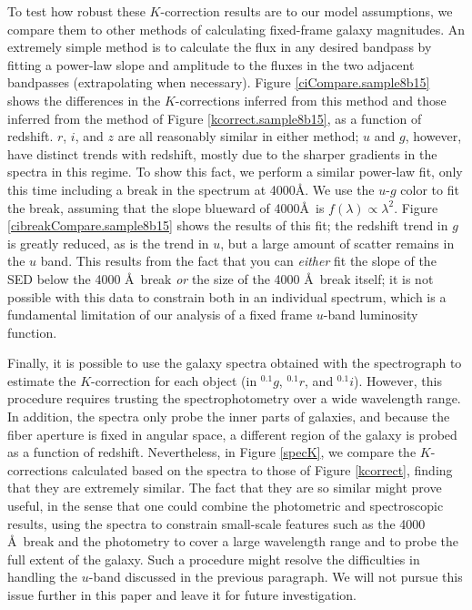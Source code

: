 \documentclass[10pt,preprint]{aastex}
\newcommand{\band}[2]{\ensuremath{^{#1}{#2}}}
\begin{document}
To test how robust these $K$-correction results are to our model
assumptions, we compare them to other methods of calculating
fixed-frame galaxy magnitudes.  An extremely simple method is to
calculate the flux in any desired bandpass by fitting a power-law
slope and amplitude to the fluxes in the two adjacent bandpasses
(extrapolating when necessary). Figure \ref{ciCompare.sample8b15}
shows the differences in the $K$-corrections inferred from this method
and those inferred from the method of Figure
\ref{kcorrect.sample8b15}, as a function of redshift. $r$, $i$, and
$z$ are all reasonably similar in either method; $u$ and $g$, however,
have distinct trends with redshift, mostly due to the sharper
gradients in the spectra in this regime. To show this fact, we perform
a similar power-law fit, only this time including a break in the
spectrum at 4000\AA. We use the $u$-$g$ color to fit the break,
assuming that the slope blueward of 4000\AA\ is $f(\lambda)\propto
\lambda^{2}$.  Figure \ref{cibreakCompare.sample8b15} shows the
results of this fit; the redshift trend in $g$ is greatly reduced, as
is the trend in $u$, but a large amount of scatter remains in the $u$
band. This results from the fact that you can {\it either} fit the
slope of the SED below the 4000 \AA\ break {\it or} the size of the
4000 \AA\ break itself; it is not possible with this data to constrain
both in an individual spectrum, which is a fundamental limitation of
our analysis of a fixed frame $u$-band luminosity function.

Finally, it is possible to use the galaxy spectra obtained with the
spectrograph to estimate the $K$-correction for each object (in
\band{0.1}{g}, \band{0.1}{r}, and \band{0.1}{i}). However, this
procedure requires trusting the spectrophotometry over a wide
wavelength range. In addition, the spectra only probe the inner parts
of galaxies, and because the fiber aperture is fixed in angular space,
a different region of the galaxy is probed as a function of
redshift. Nevertheless, in Figure \ref{specK}, we compare the
$K$-corrections calculated based on the spectra to those of Figure
\ref{kcorrect}, finding that they are extremely similar. The fact that
they are so similar might prove useful, in the sense that one could
combine the photometric and spectroscopic results, using the spectra
to constrain small-scale features such as the 4000 \AA\ break and the
photometry to cover a large wavelength range and to probe the full
extent of the galaxy. Such a procedure might resolve the difficulties
in handling the $u$-band discussed in the previous paragraph. We will
not pursue this issue further in this paper and leave it for future
investigation.
\end{document}
